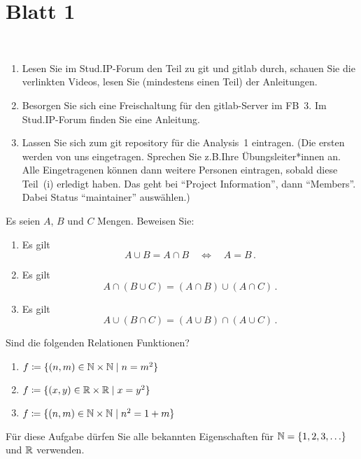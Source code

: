 \section*{Blatt 1}

\setcounter{blatt}{1}

\begin{aufg}[2 Punkte]\mbox{ }
\begin{enumerate}[label=$\mathrm{(\roman*)}$, ref=$\mathrm{\roman*}$]
\item Lesen Sie im Stud.IP-Forum den Teil zu git und gitlab durch, schauen Sie die verlinkten Videos, lesen Sie (mindestens einen Teil) der Anleitungen.
\item Besorgen Sie sich eine Freischaltung für den gitlab-Server im FB~3. Im Stud.IP-Forum finden Sie eine Anleitung.
\item Lassen Sie sich zum git repository f\"ur die Analysis~1 eintragen. (Die ersten werden von uns eingetragen. Sprechen Sie z.B.\@ Ihre \"Ubungsleiter*innen an. Alle Eingetragenen k\"onnen dann weitere Personen eintragen, sobald diese Teil~(i) erledigt haben. Das geht bei ``Project Information'', dann ``Members''. Dabei Status ``maintainer'' ausw\"ahlen.) 
\end{enumerate}
\end{aufg}

\bigskip

\begin{aufg}[6 Punkte]
Es seien $A$, $B$ und $C$ Mengen. Beweisen Sie: 
\begin{enumerate}[label=$\mathrm{(\roman*)}$, ref=$\mathrm{\roman*}$]
 \item Es gilt 
 \[
  A\cup B = A\cap B \quad\Leftrightarrow\quad  A=B\,.
 \]
 \item Es gilt 
 \[
  A \cap (B \cup C) = (A\cap B) \cup (A\cap C)\,.
 \]
 \item Es gilt 
 \[
  A \cup (B \cap C) = (A\cup B) \cap (A\cup C)\,.
 \]
\end{enumerate}
\end{aufg}
 
\bigskip 

\begin{lsg}
 
\end{lsg} 

\bigskip


\begin{aufg}[6 Punkte]
Sind die folgenden Relationen Funktionen?
\begin{enumerate}[label=$\mathrm{(\roman*)}$, ref=$\mathrm{\roman*}$]
\item $f \coloneqq \{(n,m)\in \mathbb{N}\times\mathbb{N} \mid n=m^2\}$
\item $f \coloneqq \{(x,y)\in \mathbb{R}\times\mathbb{R} \mid x=y^2\}$
\item $f \coloneqq \{(n,m)\in \mathbb{N}\times\mathbb{N} \mid n^2=1+m\}$
\end{enumerate}
F\"ur diese Aufgabe d\"urfen Sie alle bekannten Eigenschaften f\"ur $\mathbb{N}=\{1,2,3,\ldots\}$ und $\mathbb{R}$ verwenden.
\end{aufg}

